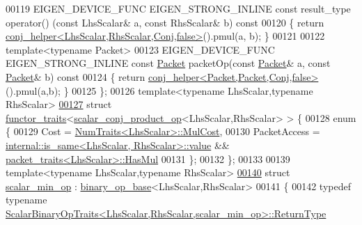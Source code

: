 \begin{DoxyCode}
00119   EIGEN\_DEVICE\_FUNC EIGEN\_STRONG\_INLINE \textcolor{keyword}{const} result\_type operator() (\textcolor{keyword}{const} LhsScalar& a, \textcolor{keyword}{const} RhsScalar& 
      b)\textcolor{keyword}{ const}
00120 \textcolor{keyword}{  }\{ \textcolor{keywordflow}{return} \hyperlink{struct_eigen_1_1internal_1_1conj__helper}{conj\_helper<LhsScalar,RhsScalar,Conj,false>}().pmul(a,
      b); \}
00121   
00122   \textcolor{keyword}{template}<\textcolor{keyword}{typename} Packet>
00123   EIGEN\_DEVICE\_FUNC EIGEN\_STRONG\_INLINE \textcolor{keyword}{const} \hyperlink{union_eigen_1_1internal_1_1_packet}{Packet} packetOp(\textcolor{keyword}{const} \hyperlink{union_eigen_1_1internal_1_1_packet}{Packet}& a, \textcolor{keyword}{const} 
      \hyperlink{union_eigen_1_1internal_1_1_packet}{Packet}& b)\textcolor{keyword}{ const}
00124 \textcolor{keyword}{  }\{ \textcolor{keywordflow}{return} \hyperlink{struct_eigen_1_1internal_1_1conj__helper}{conj\_helper<Packet,Packet,Conj,false>}().pmul(a,b); \}
00125 \};
00126 \textcolor{keyword}{template}<\textcolor{keyword}{typename} LhsScalar,\textcolor{keyword}{typename} RhsScalar>
\hyperlink{struct_eigen_1_1internal_1_1functor__traits_3_01scalar__conj__product__op_3_01_lhs_scalar_00_01_rhs_scalar_01_4_01_4}{00127} \textcolor{keyword}{struct }\hyperlink{struct_eigen_1_1internal_1_1functor__traits}{functor\_traits}<\hyperlink{struct_eigen_1_1internal_1_1scalar__conj__product__op}{scalar\_conj\_product\_op}<LhsScalar,RhsScalar> > \{
00128   \textcolor{keyword}{enum} \{
00129     Cost = \hyperlink{group___core___module_struct_eigen_1_1_num_traits}{NumTraits<LhsScalar>::MulCost},
00130     PacketAccess = \hyperlink{struct_eigen_1_1internal_1_1is__same}{internal::is\_same<LhsScalar, RhsScalar>::value}
       && \hyperlink{struct_eigen_1_1internal_1_1packet__traits}{packet\_traits<LhsScalar>::HasMul}
00131   \};
00132 \};
00133 
00139 \textcolor{keyword}{template}<\textcolor{keyword}{typename} LhsScalar,\textcolor{keyword}{typename} RhsScalar>
\hyperlink{struct_eigen_1_1internal_1_1scalar__min__op}{00140} \textcolor{keyword}{struct }\hyperlink{struct_eigen_1_1internal_1_1scalar__min__op}{scalar\_min\_op} : \hyperlink{struct_eigen_1_1internal_1_1binary__op__base}{binary\_op\_base}<LhsScalar,RhsScalar>
00141 \{
00142   \textcolor{keyword}{typedef} \textcolor{keyword}{typename} 
      \hyperlink{group___core___module_struct_eigen_1_1_scalar_binary_op_traits}{ScalarBinaryOpTraits<LhsScalar,RhsScalar,scalar\_min\_op>::ReturnType}

\end{DoxyCode}
